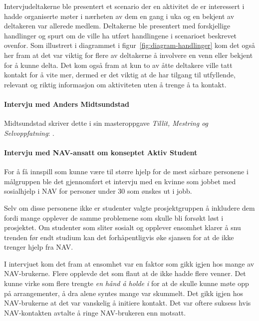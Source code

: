 Intervjudeltakerne ble presentert et scenario der en aktivitet de er interessert i hadde organiserte møter i nærheten av dem en gang i uka og en bekjent av deltakeren var allerede medlem. Deltakerne ble presentert med forskjellige handlinger og spurt om de ville ha utført handlingene i scenarioet beskrevet ovenfor. Som illustrert i diagrammet i figur~\ref{fig:diagram-handlinger} kom det også her fram at det var viktig for flere av deltakerne å involvere en venn eller bekjent for å kunne delta. Det kom også fram at kun to av åtte deltakere ville tatt kontakt for å vite mer, dermed er det viktig at de har tilgang til utfyllende, relevant og riktig informasjon om aktiviteten uten å trenge å ta kontakt.

\paragraph{Intervju med Anders Midtsundstad}
Midtsundstad skriver dette i sin masteroppgave {\em Tillit, Mestring og Selvoppfatning}:  \cite{TILLIT:13}.

\paragraph{Intervju med NAV-ansatt om konseptet Aktiv Student}
For å få innspill som kunne være til større hjelp for de mest sårbare personene i målgruppen ble det gjennomført et intervju med en kvinne som jobbet med sosialhjelp i NAV for personer under 30 som ønskes ut i jobb. 

Selv om disse personene ikke er studenter valgte prosjektgruppen å inkludere dem fordi mange opplever de samme problemene som skulle bli forsøkt løst i prosjektet. Om studenter som sliter sosialt og opplever ensomhet klarer å snu trenden før endt studium kan det forhåpentligvis øke sjansen for at de ikke trenger hjelp fra NAV.

I intervjuet kom det fram at ensomhet var en faktor som gikk igjen hos mange av NAV-brukerne. Flere opplevde det som flaut at de ikke hadde flere venner. Det kunne virke som flere trengte {\em en hånd å holde i} for at de skulle kunne møte opp på arrangementer, å dra alene syntes mange var skummelt. Det gikk igjen hos NAV-brukerne at det var vanskelig å initiere kontakt. Det var oftere suksess hvis NAV-kontakten avtalte å ringe NAV-brukeren enn motsatt.


